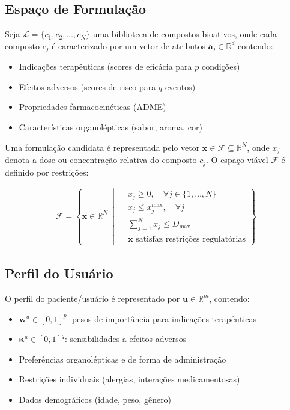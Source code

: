 \documentclass[12pt, a4paper]{article}
\begin{document}
\subsection{Espaço de Formulação}

Seja $\mathcal{L} = \{c_1, c_2, \ldots, c_N\}$ uma biblioteca de compostos bioativos, onde cada composto $c_j$ é caracterizado por um vetor de atributos $\mathbf{a}_j \in \mathbb{R}^d$ contendo:

\begin{itemize}
    \item Indicações terapêuticas (scores de eficácia para $p$ condições)
    \item Efeitos adversos (scores de risco para $q$ eventos)
    \item Propriedades farmacocinéticas (ADME)
    \item Características organolépticas (sabor, aroma, cor)
\end{itemize}

Uma formulação candidata é representada pelo vetor $\mathbf{x} \in \mathcal{F} \subseteq \mathbb{R}^N$, onde $x_j$ denota a dose ou concentração relativa do composto $c_j$. O espaço viável $\mathcal{F}$ é definido por restrições:

\begin{align}
\mathcal{F} = \left\{ \mathbf{x} \in \mathbb{R}^N \,\middle|\, 
\begin{aligned}
    &x_j \geq 0, \quad \forall j \in \{1,\ldots,N\} \\
    &x_j \leq x_j^{\max}, \quad \forall j \\
    &\sum_{j=1}^N x_j \leq D_{\max} \\
    &\mathbf{x} \text{ satisfaz restrições regulatórias}
\end{aligned}
\right\}
\end{align}

\subsection{Perfil do Usuário}

O perfil do paciente/usuário é representado por $\mathbf{u} \in \mathbb{R}^m$, contendo:

\begin{itemize}
    \item $\mathbf{w}^u \in [0,1]^p$: pesos de importância para indicações terapêuticas
    \item $\boldsymbol{\kappa}^u \in [0,1]^q$: sensibilidades a efeitos adversos
    \item Preferências organolépticas e de forma de administração
    \item Restrições individuais (alergias, interações medicamentosas)
    \item Dados demográficos (idade, peso, gênero)
\end{itemize}
\end{document}
